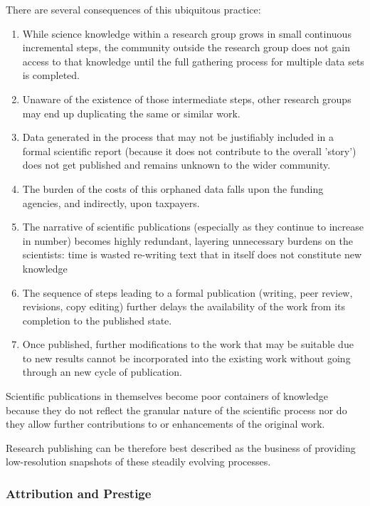 \documentclass[final,authoryear,3p]{elsarticle-open-drafting}
\begin{document}
There are several consequences of this ubiquitous practice:

\begin{enumerate}
\item While science knowledge within a research group grows in small continuous incremental steps, the community outside the research group does not gain access to that knowledge until the full gathering process for multiple data sets is completed. 
\item Unaware of the existence of those intermediate steps, other research groups may end up duplicating the same or similar work. 
\item Data generated in the process that may not be justifiably included in a formal scientific report (because it does not 
contribute to the overall 'story') does not get published and remains unknown to the wider community. 
\item The burden of the costs of this orphaned data falls upon the funding agencies, and indirectly, upon taxpayers. 
\item The narrative of scientific publications (especially as they continue to increase in number) becomes highly redundant, 
layering unnecessary burdens on the scientists: time is wasted re-writing text that in itself does not constitute new knowledge
\item The sequence of steps leading to a formal publication (writing, peer review, revisions, copy editing) further delays the 
availability of the work from its completion to the published state. %
\item Once published, further modifications to the work that may be suitable due to new results cannot be incorporated into the existing work without going through an new cycle of publication. 
\end{enumerate}

Scientific publications in themselves become poor containers of knowledge because they do not reflect the granular nature of the scientific process nor do they allow further contributions to or enhancements of the original work. 

Research publishing can be therefore best described as the business of providing low-resolution snapshots of these steadily evolving processes. 

\subsubsection{Attribution and Prestige}
\end{document}
